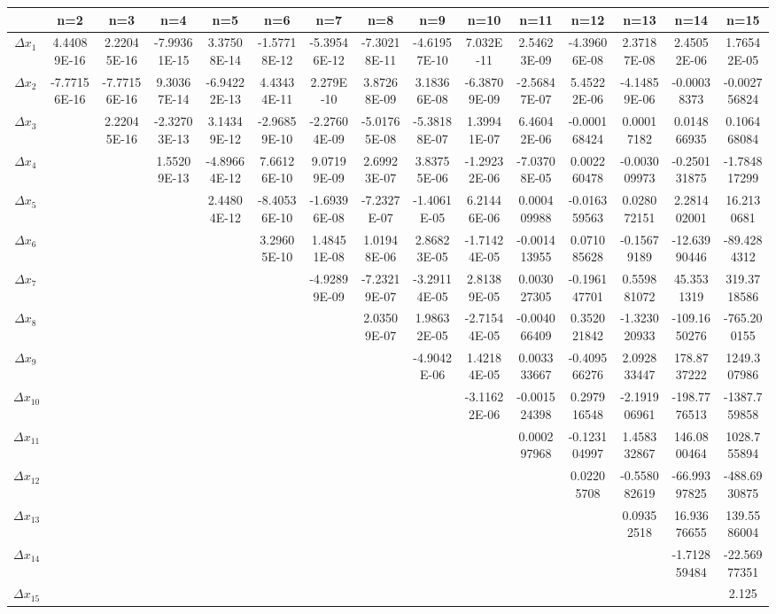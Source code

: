 \documentclass[a4paper]{article}
\begin{document}
\begin{CJK*}{GBK}{song}
\begin{center}
\begin{table*}[!htpb]
{\begin{threeparttable}[!htpb]
\begin{tabular}{ccccc ccccc ccccc}
 &n=2&n=3 &n=4 &n=5 &n=6 &n=7 &n=8 &n=9 &n=10 &n=11 &n=12 &n=13 &n=14 &n=15 \\ \hline
$\Delta x_{1}$	&	4.44089E-16	&	2.22045E-16	&	-7.99361E-15	&	3.37508E-14	&	-1.57718E-12	&	-5.39546E-12	&	-7.30218E-11	&	-4.61957E-10	&	7.032E-11	&	2.54623E-09	&	-4.39606E-08	&	2.37187E-08	&	2.45052E-06	&	1.76542E-05	\\
$\Delta x_{2}$	&	-7.77156E-16	&	-7.77156E-16	&	9.30367E-14	&	-6.94222E-13	&	4.43434E-11	&	2.279E-10	&	3.87268E-09	&	3.18366E-08	&	-6.38709E-09	&	-2.56847E-07	&	5.45222E-06	&	-4.14859E-06	&	-0.00038373	&	-0.002756824	\\
$\Delta x_{3}$	&		&	2.22045E-16	&	-2.32703E-13	&	3.14349E-12	&	-2.96859E-10	&	-2.27604E-09	&	-5.01765E-08	&	-5.38188E-07	&	1.39941E-07	&	6.46042E-06	&	-0.000168424	&	0.00017182	&	0.014866935	&	0.106468084	\\
$\Delta x_{4}$	&		&		&	1.55209E-13	&	-4.89664E-12	&	7.66126E-10	&	9.07199E-09	&	2.69923E-07	&	3.83755E-06	&	-1.29232E-06	&	-7.03708E-05	&	0.002260478	&	-0.003009973	&	-0.250131875	&	-1.784817299	\\
$\Delta x_{5}$	&		&		&		&	2.44804E-12	&	-8.40536E-10	&	-1.69396E-08	&	-7.2327E-07	&	-1.4061E-05	&	6.21446E-06	&	0.000409988	&	-0.016359563	&	0.028072151	&	2.281402001	&	16.2130681	\\
$\Delta x_{6}$	&		&		&		&		&	3.29605E-10	&	1.48451E-08	&	1.01948E-06	&	2.86823E-05	&	-1.71424E-05	&	-0.001413955	&	0.071085628	&	-0.15679189	&	-12.63990446	&	-89.4284312	\\
$\Delta x_{7}$	&		&		&		&		&		&	-4.92899E-09	&	-7.23219E-07	&	-3.29114E-05	&	2.81389E-05	&	0.003027305	&	-0.196147701	&	0.559881072	&	45.3531319	&	319.3718586	\\
$\Delta x_{8}$	&		&		&		&		&		&		&	2.03509E-07	&	1.98632E-05	&	-2.71544E-05	&	-0.004066409	&	0.352021842	&	-1.323020933	&	-109.1650276	&	-765.200155	\\
$\Delta x_{9}$	&		&		&		&		&		&		&		&	-4.9042E-06	&	1.42184E-05	&	0.003333667	&	-0.409566276	&	2.092833447	&	178.8737222	&	1249.307986	\\
$\Delta x_{10}$	&		&		&		&		&		&		&		&		&	-3.11622E-06	&	-0.001524398	&	0.297916548	&	-2.191906961	&	-198.7776513	&	-1387.759858	\\
$\Delta x_{11}$	&		&		&		&		&		&		&		&		&		&	0.000297968	&	-0.123104997	&	1.458332867	&	146.0800464	&	1028.755894	\\
$\Delta x_{12}$	&		&		&		&		&		&		&		&		&		&		&	0.02205708	&	-0.558082619	&	-66.99397825	&	-488.6930875	\\
$\Delta x_{13}$	&		&		&		&		&		&		&		&		&		&		&		&	0.09352518	&	16.93676655	&	139.5586004	\\
$\Delta x_{14}$	&		&		&		&		&		&		&		&		&		&		&		&		&	-1.712859484	&	-22.56977351	\\
$\Delta x_{15}$	&		&		&		&		&		&		&		&		&		&		&		&		&		&	2.125	\\


\end{tabular}
\end{threeparttable}}
\end{table*}
\end{center}
\end{CJK*}
\end{document}
